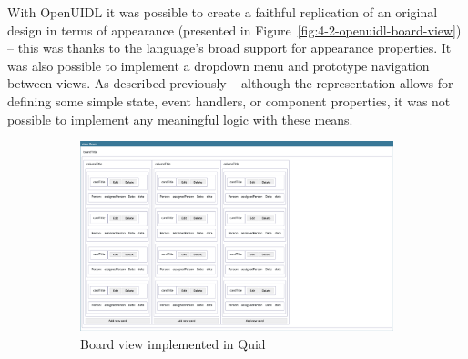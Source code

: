 With OpenUIDL it was possible to create a faithful replication of an original design in terms of appearance (presented in Figure~\ref{fig:4-2-openuidl-board-view}) -- this was thanks to the language's broad support for appearance properties.
It was also possible to implement a dropdown menu and prototype navigation between views.
As described previously -- although the representation allows for defining some simple state, event handlers, or component properties, it was not possible to implement any meaningful logic with these means.

\begin{figure}[tbh]
    \centering
    \begin{subfigure}[m]{0.5\textwidth}
        \centering
        \includegraphics[height=0.2\textheight]{./4-results-and-discussion/quid-board-view}
        \caption{Board view implemented in Quid}
        \label{fig:4-2-quid-board-view}
    \end{subfigure}
    \hfill
    \begin{subfigure}[m]{0.35\textwidth}
        \centering

\end{subfigure}
\end{figure}
